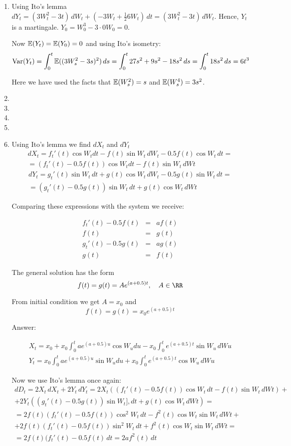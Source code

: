 \documentclass[12pt, a4paper]{article}
\begin{document}
\begin{enumerate}
\item Using Ito’s lemma $dY_t = (3W_t^2 - 3t) \, dW_t + (-3W_t + \frac{1}{2}6W_t) \, dt= (3W_t^2 - 3t) \, dW_t$. Hence, $Y_t$ is a martingale. $Y_0=W_0^3-3\cdot 0 W_0=0$.

Now $\mathbb{E}(Y_t)=\mathbb{E}(Y_0)=0$ and using Ito's isometry:
\[
\operatorname{Var}(Y_t)=
\int_0^t \mathbb{E}((3W_s^2-3s)^2) \, ds = \int_0^t 27s^2 +9s^2-18s^2 \, ds = \int_0^t 18s^2 \, ds = 6t^3
\]

Here we have used the facts that $\mathbb{E}(W_s^2)=s$ and $\mathbb{E}(W_s^4)=3s^2$.
\item
\item
\item
\item 

\item Using Ito's lemma  we find $dX_t$ and $dY_t$
\label{spiral_wiener}
\begin{multline*}
dX_t=f_t'(t) \cos W_t dt -f(t)\sin W_t \, dW_t-0.5f(t)\cos W_t\, dt=\\
= (f_t'(t)-0.5f(t))\cos W_tdt -f(t)\sin W_t \,dWt
\end{multline*}
\begin{multline*}
dY_t=g_t'(t) \sin W_t \, dt +g(t)\cos W_t \, dW_t-0.5g(t)\sin W_t\,dt=\\
= (g_t'(t)-0.5g(t))\sin W_t\,dt +g(t)\cos W_t \,dWt
\end{multline*}

Comparing these expressions with the system we receive:

\[
\begin{array}{rcl}
f_t'(t)-0.5f(t) &=& af(t)\\
f(t)&=&g(t)\\
 g_t'(t)-0.5g(t)&=&ag(t)\\
g(t)&=&f(t)
\end{array}
\]

The general solution has the form
\[
f(t)=g(t)=A e^{(a+0.5)t}, \quad A\in  \RR
\]

From initial condition we get $A=x_0$ and
\[
f(t)=g(t)=x_0 e^{(a+0.5)t}
\]

Answer:

\[
\begin{array}{l}
X_t=x_0+x_0\int_{0}^{t} a e^{(a+0.5)u} \cos W_u du - x_0\int_{0}^{t} e^{(a+0.5)t}\sin W_u \,dWu\\
Y_t=x_0\int_{0}^{t} a e^{(a+0.5)u} \sin W_u du +x_0\int_{0}^{t} e^{(a+0.5)t}\cos W_u \, dWu
\end{array}
\]


Now we use Ito's lemma once again:
\begin{multline*}
dD_t=2X_t \, dX_t+2Y_t \, dY_t=2X_t((f_t'(t)-0.5f(t))\cos W_t \, dt -f(t)\sin W_t \,dWt)+\\
+ 2Y_t((g_t'(t)-0.5g(t))\sin W_t ], dt +g(t)\cos W_t\,dWt)=\\
=2f(t)(f_t'(t)-0.5f(t))\cos^2 W_t \, dt-f^2(t)\cos W_t\sin W_t\,dWt+\\
+2f(t)(f_t'(t)-0.5f(t))\sin^2 W_t \, dt+f^2(t)\cos W_t\sin W_t\,dWt=\\
=2f(t)(f_t'(t)-0.5f(t) \, dt=2af^2(t)\,dt
\end{multline*}


\end{enumerate}
\end{document}
